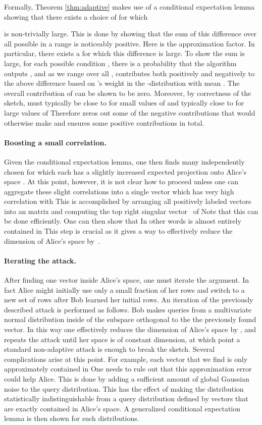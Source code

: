 \documentclass[11pt]{article}
\begin{document}
Formally, Theorem \ref{thm:adaptive} makes use of a conditional expectation
lemma showing that there exists a choice of  for which 
 
is non-trivially large. This is done by showing that the sum of this
difference over all possible  in a range  is noticeably
positive. Here  is the approximation factor. 
In particular, there exists a  for which this difference is
large. To show the sum is large, for each possible condition , there is a probability  that the algorithm outputs ,
and as we range over all ,  contributes both positively and
negatively to the above difference based on 's weight in the -distribution 
with mean . The overall contribution of  can be shown to be
zero. Moreover, by correctness of the sketch,  must typically be close to  for
small values of  and typically close to  for large values of  
Therefore  zeros out some of the negative contributions that  would otherwise
make and ensures some positive contributions in total.

\paragraph{Boosting a small correlation.}
Given the conditional expectation lemma, one then finds many independently
chosen  for which each  has a slightly increased expected projection
onto Alice's space . At this point, however, it is not clear how to
proceed unless one can aggregate these slight correlations into a single vector
which has very high correlation with  This is accomplished by arranging
all  positively labeled vectors  into an  matrix  and
computing the top right singular vector~ of  Note that this can be
done efficiently.  One can then show that  In
other words  is almost entirely contained in  This step is crucial
as it gives a way to effectively reduce the dimension of Alice's space
by~. 

\paragraph{Iterating the attack.}
After finding one vector inside Alice's space, one must iterate the argument. In fact 
Alice might initially use only a small fraction of her rows and switch to a new set
of rows after Bob learned her initial rows.
An iteration of the previously described attack is performed as follows. Bob makes
queries from a multivariate normal distribution inside of the subspace
orthogonal to the the previously found vector. In this way one effectively
reduces the dimension of Alice's space by , and repeats the attack
until her space is of constant dimension, at which point a standard
non-adaptive attack is enough to break the sketch. Several complications
arise at this point. For example, each vector that we find is only approximately contained
in  One needs to rule out that this approximation error could help Alice.
This is done by adding a sufficient amount of global Gaussian noise to the query
distribution. This has the effect of making the distribution statistically
indistinguishable from a query distribution defined by vectors that are exactly
contained in Alice's space. A generalized
conditional expectation lemma is then shown for such distributions.
\end{document}

